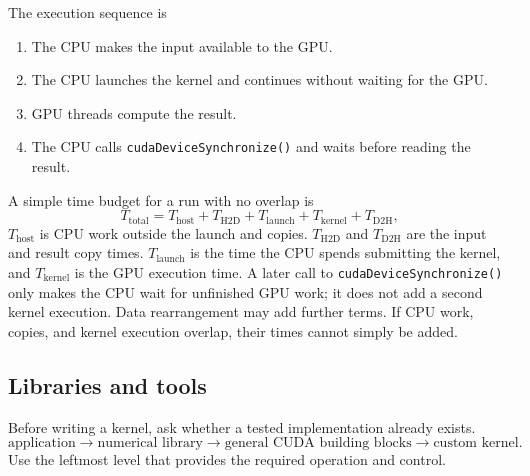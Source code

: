 \documentclass[11pt]{article}
\numberwithin{equation}{section}
\numberwithin{figure}{section}
\numberwithin{table}{section}
\newcommand{\code}[1]{\texttt{#1}}
\begin{document}
The execution sequence is
\begin{enumerate}
  \item The CPU makes the input available to the GPU.
  \item The CPU launches the kernel and continues without waiting for the GPU.
  \item GPU threads compute the result.
  \item The CPU calls \code{cudaDeviceSynchronize()} and waits before reading the
  result.
\end{enumerate}

A simple time budget for a run with no overlap is
\begin{equation}
  T_{\mathrm{total}}
  =T_{\mathrm{host}}
   +T_{\mathrm{H2D}}
   +T_{\mathrm{launch}}
   +T_{\mathrm{kernel}}
   +T_{\mathrm{D2H}},
  \label{eq:heterogeneous-time-budget}
\end{equation}
$T_{\mathrm{host}}$ is CPU work outside the launch and copies.
$T_{\mathrm{H2D}}$ and $T_{\mathrm{D2H}}$ are the input and result copy times.
$T_{\mathrm{launch}}$ is the time the CPU spends submitting the kernel, and
$T_{\mathrm{kernel}}$ is the GPU execution time.  A later call to
\code{cudaDeviceSynchronize()} only makes the CPU wait for unfinished GPU work; it
does not add a second kernel execution.  Data rearrangement may add further terms.
If CPU work, copies, and kernel execution overlap, their times cannot simply be
added.

\subsection{Libraries and tools}
\label{chap:ecosystem}

Before writing a kernel, ask whether a tested implementation already exists.
\begin{equation}
  \text{application}
  \longrightarrow \text{numerical library}
  \longrightarrow \text{general CUDA building blocks}
  \longrightarrow \text{custom kernel}.
  \label{eq:abstraction-ladder}
\end{equation}
Use the leftmost level that provides the required operation and control.
\end{document}
